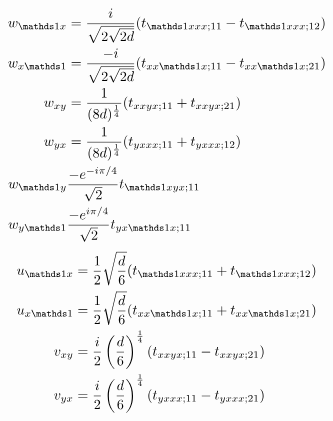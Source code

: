 \begin{align}
w_{\unit x} &= \frac{i}{\sqrt{2 \sqrt{2d}}}(t_{\unit xxx; 11} - t_{\unit xxx;12}) \\
w_{x \unit}  &= \frac{-i}{\sqrt{2\sqrt{2d}}} (t_{xx \unit x;11}-t_{xx\unit x ;21}) \\
w_{xy} & = \frac{1}{(8d)^{\frac14}}(t_{xx y x ;11} + t_{xxyx;21}) \\
w_{yx} & = \frac{1}{(8d)^{\frac14}}(t_{yxxx;11} + t_{yxxx;12}) \\
w_{\unit y } & \frac{-e^{-i\pi/4}}{\sqrt{2}} t_{\unit x y x;11}\\
w_{y \unit} & \frac{-e^{i\pi/4}}{\sqrt{2}} t_{yx \unit x ;11}
\end{align}
\begin{align}
u_{\unit x}  & = \frac{1}{2}\sqrt{\frac{d}{6}}( t_{\unit xxx;11}+t_{\unit xxx;12})\\
u_{x \unit} & = \frac{1}{2}\sqrt{\frac{d}{6}}(t_{xx\unit x;11}+t_{xx \unit x;21})\\
v_{xy } & = \frac{i}{2}\left( \frac{d}{6} \right)^{\frac14} (t_{xxy x;11}-t_{xxyx;21})\\
v_{yx} & = \frac{i}{2}\left( \frac{d}{6} \right)^{\frac14} (t_{yxxx;11}-t_{yxxx;21})
\end{align}
